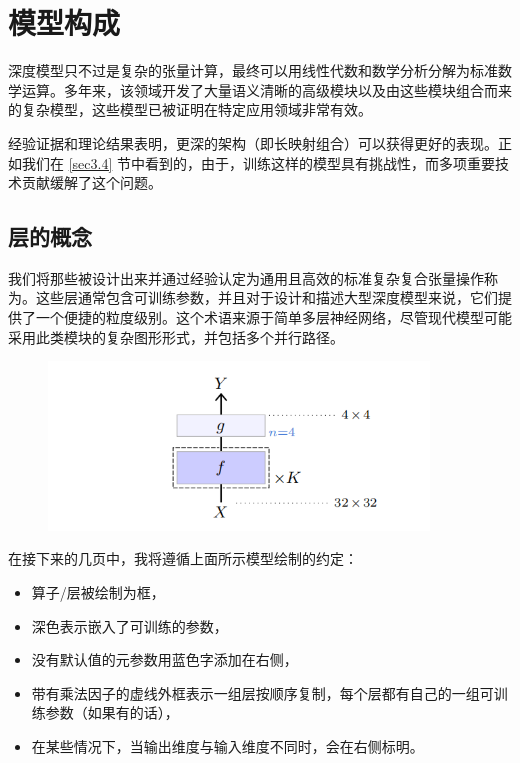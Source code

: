 \chapter{模型构成}\label{ch4}

深度模型只不过是复杂的张量计算，最终可以用线性代数和数学分析分解为标准数学运算。多年来，该领域开发了大量语义清晰的高级模块以及由这些模块组合而来的复杂模型，这些模型已被证明在特定应用领域非常有效。

经验证据和理论结果表明，更深的架构（即长映射组合）可以获得更好的表现。正如我们在 \ref{sec3.4} 节中看到的，由于，训练这样的模型具有挑战性，而多项重要技术贡献缓解了这个问题。

\section{层的概念}\label{sec4.1}

我们将那些被设计出来并通过经验认定为通用且高效的标准复杂复合张量操作称为。这些层通常包含可训练参数，并且对于设计和描述大型深度模型来说，它们提供了一个便捷的粒度级别。这个术语来源于简单多层神经网络，尽管现代模型可能采用此类模块的复杂图形形式，并包括多个并行路径。

\begin{figure}[h]
    \centering
    \includegraphics[width=0.9\textwidth]{fig/fig4.0.png}
\end{figure}

在接下来的几页中，我将遵循上面所示模型绘制的约定：

\begin{itemize}
    \item 算子/层被绘制为框，
    \item 深色表示嵌入了可训练的参数，
    \item 没有默认值的元参数用蓝色字添加在右侧，
    \item 带有乘法因子的虚线外框表示一组层按顺序复制，每个层都有自己的一组可训练参数（如果有的话），
    \item 在某些情况下，当输出维度与输入维度不同时，会在右侧标明。
\end{itemize}

